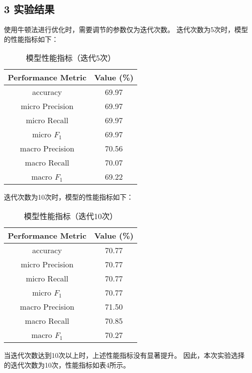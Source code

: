 \documentclass{article}
\begin{document}
\subsection*{3 实验结果}
使用牛顿法进行优化时，需要调节的参数仅为迭代次数。
迭代次数为5次时，模型的性能指标如下：

\begin{table}[h]
    \centering
     \caption{模型性能指标（迭代5次）}
     \vspace{2mm}
    \label{tab:my_label}
    \begin{tabular}{|c|c|}
       \hline
       Performance Metric & Value (\%) \\
       \hline
       accuracy & 69.97 \\
       \hline
       micro Precision  & 69.97\\
       \hline
       micro Recall & 69.97\\
       \hline
       micro $F_1$ & 69.97\\
       \hline
       macro Precision  & 70.56\\
       \hline
       macro Recall & 70.07\\
       \hline
       macro $F_1$ & 69.22\\
       \hline
    \end{tabular}
\end{table}

迭代次数为10次时，模型的性能指标如下：
\begin{table}[h]
    \centering
     \caption{模型性能指标（迭代10次）}
     \vspace{2mm}
    \label{tab:my_label}
    \begin{tabular}{|c|c|}
       \hline
       Performance Metric & Value (\%) \\
       \hline
       accuracy & 70.77 \\
       \hline
       micro Precision  & 70.77\\
       \hline
       micro Recall & 70.77\\
       \hline
       micro $F_1$ & 70.77\\
       \hline
       macro Precision  & 71.50\\
       \hline
       macro Recall & 70.85\\
       \hline
       macro $F_1$ & 70.27\\
       \hline
    \end{tabular}
\end{table}

当迭代次数达到10次以上时，上述性能指标没有显著提升。
因此，本次实验选择的迭代次数为10次，性能指标如表4所示。
\\\\\\
\end{document}
